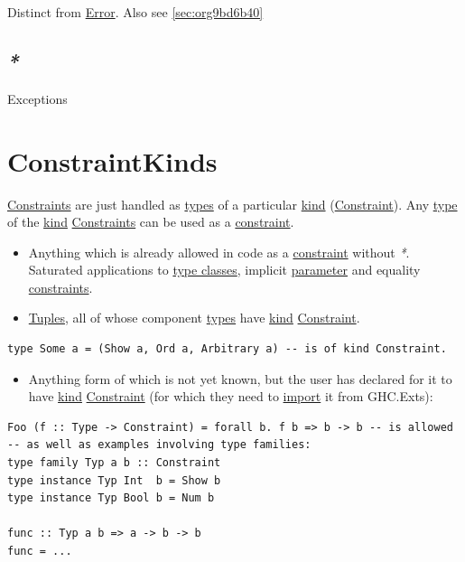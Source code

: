 \documentclass[a4paper,14pt,oneside]{book}
\begin{document}
Distinct from \hyperref[org739b6a9]{Error}. Also see \ref{sec:org9bd6b40}

\section{\emph{*}}
\label{sec:org43d82aa}

\label{orgdba0abe}Exceptions

\chapter{\label{orge0faedb}ConstraintKinds}
\label{sec:org004d7b6}
\hyperref[org3d80d52]{Constraints} are just handled as \hyperref[org55b743b]{types} of a particular \hyperref[org8fd6d74]{kind} (\hyperref[org112a6c4]{Constraint}).
Any \hyperref[orgc7cc90d]{type} of the \hyperref[org8fd6d74]{kind} \hyperref[org3d80d52]{Constraints} can be used as a \hyperref[org112a6c4]{constraint}.
\begin{itemize}
\item Anything which is already allowed in code as a \hyperref[org112a6c4]{constraint} without \emph{*}. Saturated applications to \hyperref[org8a881c3]{type classes}, implicit \hyperref[orga3871c9]{parameter} and equality \hyperref[org3d80d52]{constraints}.
\item \hyperref[org9d9b29b]{Tuples}, all of whose component \hyperref[org55b743b]{types} have \hyperref[org8fd6d74]{kind} \hyperref[org112a6c4]{Constraint}.
\end{itemize}
\begin{verbatim}
type Some a = (Show a, Ord a, Arbitrary a) -- is of kind Constraint.
\end{verbatim}
\begin{itemize}
\item Anything form of which is not yet known, but the user has declared for it to have \hyperref[org8fd6d74]{kind} \hyperref[org112a6c4]{Constraint} (for which they need to \hyperref[org0eafb8e]{import} it from GHC.Exts):
\end{itemize}
\begin{verbatim}
Foo (f :: Type -> Constraint) = forall b. f b => b -> b -- is allowed
-- as well as examples involving type families:
type family Typ a b :: Constraint
type instance Typ Int  b = Show b
type instance Typ Bool b = Num b

func :: Typ a b => a -> b -> b
func = ...
\end{verbatim}
\end{document}
